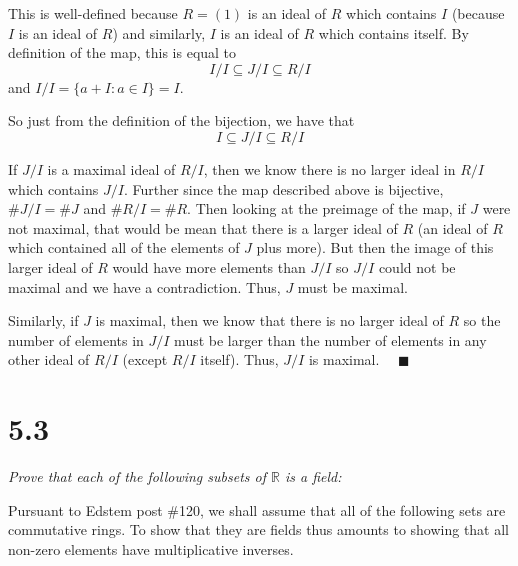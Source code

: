 \documentclass[12pt]{article}
\newcommand{\R}{\mathbb{R}}
\newcommand{\qed}{\quad \blacksquare}
\begin{document}
\begin{enumerate}
                This is well-defined because $R = (1)$ is an ideal of $R$ which contains $I$ (because $I$ is an ideal of $R$) and similarly, $I$ is an ideal of $R$ which contains itself. By definition of the map, this is equal to 
                \[I/I \subseteq J/I \subseteq R/I\]
                and $I/I = \{a + I: a \in I\} = I$. 

                So just from the definition of the bijection, we have that 
                \[I \subseteq J/I \subseteq R/I\]

                If $J/I$ is a maximal ideal of $R/I$, then we know there is no larger ideal in $R/I$ which contains $J/I$. Further since the map described above is bijective, $\#J/I = \#J$ and $\#R/I = \#R$. Then looking at the preimage of the map, if $J$ were not maximal, that would be mean that there is a larger ideal of $R$ (an ideal of $R$ which contained all of the elements of $J$ plus more). But then the image of this larger ideal of $R$ would have more elements than $J/I$ so $J/I$ could not be maximal and we have a contradiction. Thus, $J$ must be maximal. 

                Similarly, if $J$ is maximal, then we know that there is no larger ideal of $R$ so the number of elements in $J/I$ must be larger than the number of elements in any other ideal of $R/I$ (except $R/I$ itself). Thus, $J/I$ is maximal. $\qed$
            \color{black}
    \end{enumerate}
\pagebreak

\section*{5.3}
    \emph{Prove that each of the following subsets of $\R$ is a field:}
    
        \color{blue}
            Pursuant to Edstem post \#120, we shall assume that all of the following sets are commutative rings. To show that they are fields thus amounts to showing that all non-zero elements have multiplicative inverses. 
        \color{black}
\end{document}

